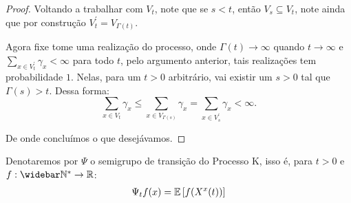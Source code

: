 \begin{proof}
  Voltando a trabalhar com $V_t$, note que se $s < t$, então $V_s
  \subseteq V_t$, note ainda que por construção $V^\prime_t =
  V_{\Gamma(t)}$.

  Agora fixe tome uma realização do processo, onde $\Gamma(t) \to
  \infty$ quando $t \to \infty$ e $\sum_{x \in V^\prime_t} \gamma_x <
  \infty$ para todo $t$, pelo argumento anterior, tais realizações tem
  probabilidade $1$. Nelas, para um $t > 0$ arbitrário, vai existir
  um $s > 0$ tal que $\Gamma(s) > t$. Dessa forma:
  \begin{displaymath}
    \sum_{x \in V_t} \gamma_x \leq \sum_{x \in V_{\Gamma(s)}}
    \gamma_x =
    \sum_{x \in V^\prime_s} \gamma_x < \infty.
  \end{displaymath}

  De onde concluímos o que desejávamos.
\end{proof}


\begin{definicao}
  \label{def:semigrupo}
  Denotaremos por $\Psi$ o semigrupo de transição do Processo K, isso
  é, para $t > 0$ e $f: \Nzb \to \R$:
  \begin{gather*}
    \Psi_t f (x) = {\mathbb{E}} \left[ f(X^x(t)) \right]\\
  \end{gather*}
\end{definicao}


